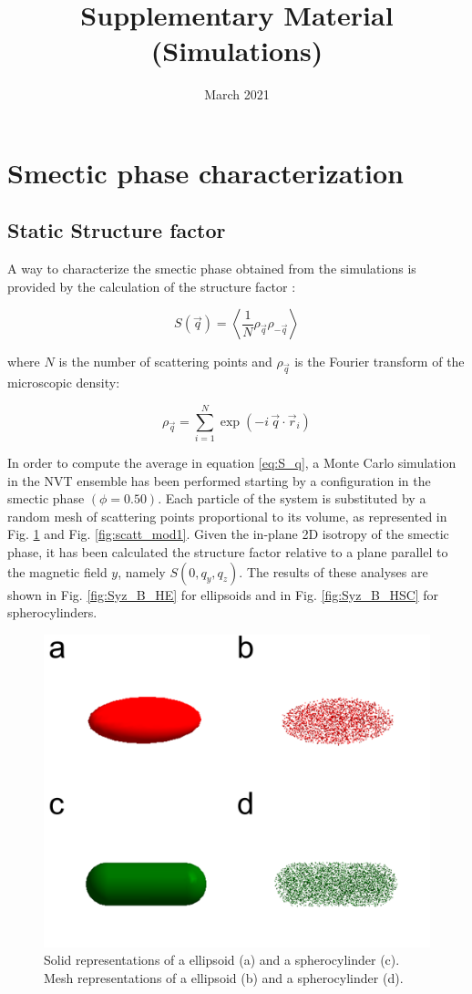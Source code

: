 \documentclass{article}
\title{Supplementary Material (Simulations)}
\date{March 2021}
\begin{document}
\maketitle

\section{Smectic phase characterization}

\subsection{Static Structure factor}

A way to characterize the smectic phase obtained from the simulations is provided by the calculation of the structure factor \cite{Hansen_McDonald}:

\begin{equation}\label{eq:S_q}
    S( \vec{q} ) = \left\langle \frac{1}{N} \rho_{\vec{q}} \rho_{-\vec{q}} \right\rangle 
\end{equation}

where $N$ is the number of scattering points and $\rho_{\vec{q}}$ is the Fourier transform of the microscopic density:

\begin{equation}
    \rho_{\vec{q}} = \sum_{i=1}^N \exp(-i\, \vec{q} \cdot \vec{r}_i)
\end{equation}

In order to compute the average in equation \ref{eq:S_q}, a Monte Carlo simulation in the NVT ensemble has been performed starting by a configuration in the smectic phase $(\phi = 0.50)$. Each particle of the system is substituted by a random mesh of scattering points proportional to its volume, as represented in Fig. \ref{fig:scatt_mod_single} and Fig. \ref{fig:scatt_mod1}. Given the in-plane 2D isotropy of the smectic phase, it has been calculated the structure factor relative to a plane parallel to the magnetic field $y$, namely $S(0, q_y, q_z)$. The results of these analyses are shown in Fig. \ref{fig:Syz_B_HE} for ellipsoids and in Fig. \ref{fig:Syz_B_HSC} for spherocylinders.

\begin{figure}
    \centering
    \includegraphics[width=0.5\columnwidth]{Scatteringmodel_single.png}
    \caption{Solid representations of a ellipsoid (a) and a spherocylinder (c). Mesh representations of a ellipsoid (b) and a spherocylinder (d).}
    \label{fig:scatt_mod_single}
\end{figure}
\end{document}
